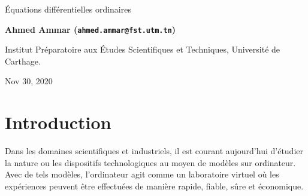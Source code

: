 \documentclass[%
oneside,                 %
final,                   %
10pt]{article}
\begin{document}

\newcommand{\exercisesection}[1]{\subsection*{#1}}






\thispagestyle{empty}

\begin{center}
{\LARGE\bf
\begin{spacing}{1.25}
Équations différentielles ordinaires
\end{spacing}
}
\end{center}


\begin{center}
{\bf Ahmed Ammar (\texttt{ahmed.ammar@fst.utm.tn})}
\end{center}

    \begin{center}
\centerline{{\small Institut Préparatoire aux Études Scientifiques et Techniques, Université de Carthage.}}
\end{center}
    

\begin{center}
Nov 30, 2020
\end{center}

\vspace{1cm}


\tableofcontents


\vspace{1cm} %




\section{Introduction}
Dans les domaines scientifiques et industriels, il est courant aujourd'hui d'étudier la nature ou les dispositifs technologiques au moyen de modèles sur ordinateur. Avec de tels modèles, l'ordinateur agit comme un laboratoire virtuel où les expériences peuvent être effectuées de manière rapide, fiable, sûre et économique.
\end{document}

